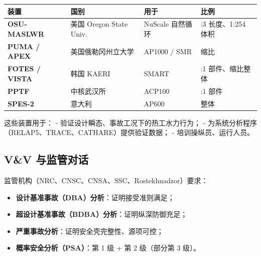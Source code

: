 \documentclass[
  UTF8,
  scheme=plain,
  fontsize=10pt,
  openany
]{ctexbook}
\begin{document}
{\def\LTcaptype{none} %
\begin{longtable}[]{@{}
  >{\raggedright\arraybackslash}p{}
  >{\raggedright\arraybackslash}p{}
  >{\raggedright\arraybackslash}p{}
  >{\raggedright\arraybackslash}p{}@{}}
\toprule\noalign{}
\begin{minipage}[b]{\linewidth}\raggedright
装置
\end{minipage} & \begin{minipage}[b]{\linewidth}\raggedright
国别
\end{minipage} & \begin{minipage}[b]{\linewidth}\raggedright
用于
\end{minipage} & \begin{minipage}[b]{\linewidth}\raggedright
比例
\end{minipage} \\
\midrule\noalign{}
\endhead
\bottomrule\noalign{}
\endlastfoot
\textbf{OSU-MASLWR} & 美国 Oregon State Univ. & NuScale 自然循环 & 1:3
长度、1:254 体积 \\
\textbf{PUMA / APEX} & 美国俄勒冈州立大学 & AP1000 / SMR & 缩比 \\
\textbf{FOTES / VISTA} & 韩国 KAERI & SMART & 1:1 部件、缩比整体 \\
\textbf{PPTF} & 中核武汉所 & ACP100 & 1:1 部件 \\
\textbf{SPES-2} & 意大利 & AP600 & 整体 \\
\end{longtable}
}

这些装置用于： - 验证设计瞬态、事故工况下的热工水力行为； -
为系统分析程序（RELAP5、TRACE、CATHARE）提供验证数据； -
培训操纵员、运行人员。

\subsection{V\&V 与监管对话}\label{vv-ux4e0eux76d1ux7ba1ux5bf9ux8bdd}

监管机构（NRC、CNSC、CNSA、SSC、Rostekhnadzor）要求：

\begin{itemize}
\tightlist
\item
  \textbf{设计基准事故（DBA）分析}：证明接受准则满足；
\item
  \textbf{超设计基准事故（BDBA）分析}：证明纵深防御充足；
\item
  \textbf{严重事故分析}：证明安全壳完整性、源项可控；
\item
  \textbf{概率安全分析（PSA）}：第 1 级 + 第 2 级（部分第 3 级）。
\end{itemize}
\end{document}
